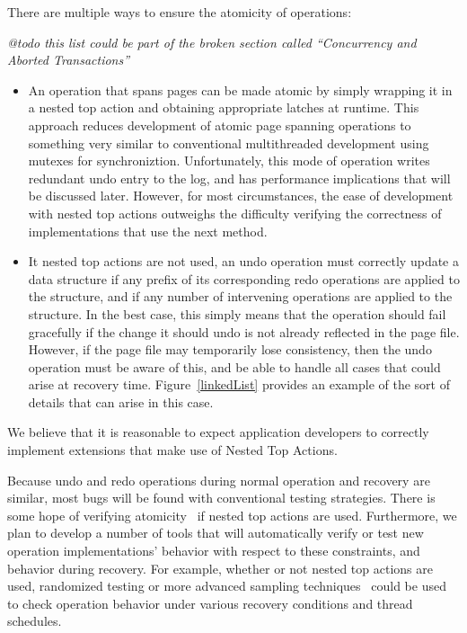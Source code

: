 \documentclass[letterpaper,twocolumn,english]{article}
\begin{document}
There are multiple ways to ensure the atomicity of operations:

{\em @todo this list could be part of the broken section called ``Concurrency and Aborted Transactions''}

\begin{itemize}
\item An operation that spans pages can be made atomic by simply
wrapping it in a nested top action and obtaining appropriate latches
at runtime.  This approach reduces development of atomic page spanning
operations to something very similar to conventional multithreaded
development using mutexes for synchroniztion.  Unfortunately, this
mode of operation writes redundant undo entry to the log, and has
performance implications that will be discussed later.  However, for
most circumstances, the ease of development with nested top actions
outweighs the difficulty verifying the correctness of implementations
that use the next method.

\item It nested top actions are not used, an undo operation must
correctly update a data structure if any prefix of its corresponding
redo operations are applied to the structure, and if any number of
intervening operations are applied to the structure.  In the best
case, this simply means that the operation should fail gracefully if
the change it should undo is not already reflected in the page file.
However, if the page file may temporarily lose consistency, then the
undo operation must be aware of this, and be able to handle all cases
that could arise at recovery time.  Figure~\ref{linkedList} provides
an example of the sort of details that can arise in this case.
\end{itemize}

We believe that it is reasonable to expect application developers to
correctly implement extensions that make use of Nested Top Actions.  

Because undo and redo operations during normal operation and recovery
are similar, most bugs will be found with conventional testing
strategies.  There is some hope of verifying atomicity~\cite{StaticAnalysisReference} if
nested top actions are used.  Furthermore, we plan to develop a
number of tools that will automatically verify or test new operation
implementations' behavior with respect to these constraints, and
behavior during recovery.  For example, whether or not nested top actions are
used, randomized testing or more advanced sampling techniques~\cite{OSDIFSModelChecker}
could be used to check operation behavior under various recovery
conditions and thread schedules.
\end{document}
